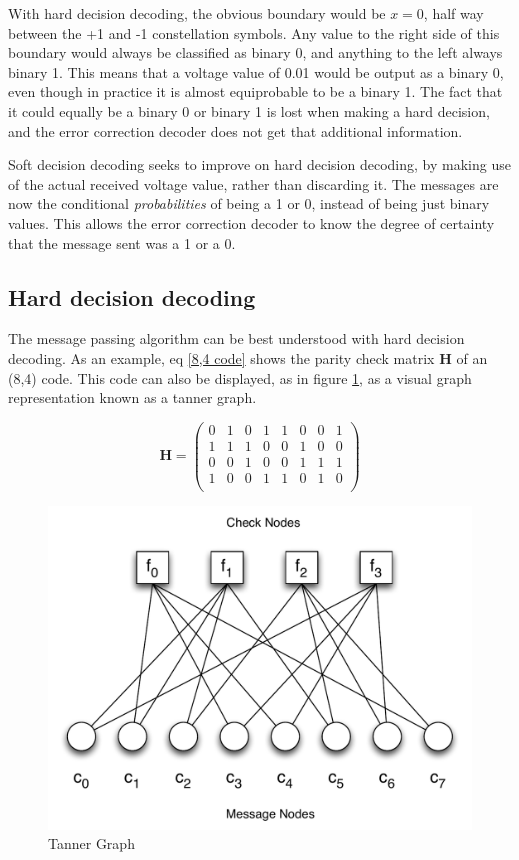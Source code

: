 \documentclass[11pt]{article}
\numberwithin{equation}{subsection}
\begin{document}
With hard decision decoding, the obvious boundary would be $x = 0$, half way between the +1 and -1 constellation symbols. Any value to the right side of this boundary would always be classified as binary 0, and anything to the left always binary 1. This means that a voltage value of 0.01 would be output as a binary 0, even though in practice it is almost equiprobable to be a binary 1. The fact that it could equally be a binary 0 or binary 1 is lost when making a hard decision, and the error correction decoder does not get that additional information.

Soft decision decoding seeks to improve on hard decision decoding, by making use of the actual received voltage value, rather than discarding it. The messages are now the conditional \textit{probabilities} of being a 1 or 0, instead of being just binary values. This allows the error correction decoder to know the degree of certainty that the message sent was a 1 or a 0.

\subsection{Hard decision decoding}
The message passing algorithm can be best understood with hard decision decoding. As an example, eq \ref{8,4 code} shows the parity check matrix $\mathbf{H}$ of an (8,4) code. This code can also be displayed, as in figure \ref{figure:tanner graph}, as a visual graph representation known as a tanner graph. \cite{leiner2005ldpc}

\begin{equation} \label{8,4 code} 
\mathbf{H} = 
\left(
\begin{array}{cccccccc}
  0 & 1 & 0 & 1 & 1 & 0 & 0 & 1 \\
  1 & 1 & 1 & 0 & 0 & 1 & 0 & 0 \\
  0 & 0 & 1 & 0 & 0 & 1 & 1 & 1 \\
  1 & 0 & 0 & 1 & 1 & 0 & 1 & 0 \\
\end{array}
\right)
\end{equation}

\begin{figure}[h]
\centering
\includegraphics[scale=0.6]{tannergraph}
\caption{Tanner Graph}
\label{figure:tanner graph}
\end{figure}
\end{document}
